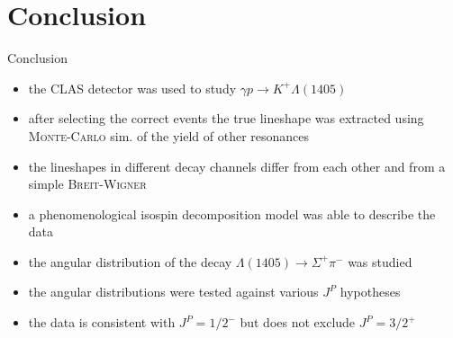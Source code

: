 \documentclass[11pt,aspectratio=1610,dvipsnames]{beamer}
\begin{document}
\section{Conclusion}
\begin{frame}{Conclusion}
\begin{minipage}{.49\linewidth}
	\begin{tcolorbox}[colback=black!10,colframe=gray!20!black,title=Lineshape measurement] 
	\begin{itemize}
		\item the CLAS detector was used to study $\gamma p \to K^+\Lambda(1405)$
		\item after selecting the correct events the true lineshape was extracted using \textsc{Monte-Carlo} sim. of the yield of other resonances
		\item the lineshapes in different decay channels differ from each other and from a simple \textsc{Breit-Wigner}
		\item a phenomenological isospin decomposition model was able to describe the data
	\end{itemize}

\end{tcolorbox}
\end{minipage}
\begin{minipage}{.49\linewidth}
	\begin{tcolorbox}[colback=black!10,colframe=gray!20!black,title=Spin parity measurement] 
		\begin{itemize}
			\item the angular distribution of the decay $\Lambda(1405)\to\Sigma^+\pi^-$ was studied
			\item the angular distributions were tested against various $J^P$ hypotheses
			\item the data is consistent with $J^P=1/2^-$ but does not exclude $J^P=3/2^+$
		\end{itemize}
		
	\end{tcolorbox}
\end{minipage}	
\end{frame}
\end{document}
